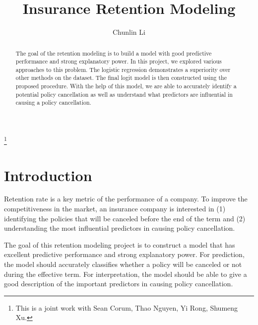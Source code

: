 \documentclass[12pt]{amsart}
\theoremstyle{definition}
\theoremstyle{remark}
\numberwithin{equation}{section}
\let\origmaketitle\maketitle
\def\maketitle{
	\begingroup
	\def\uppercasenonmath##1{} %
	\origmaketitle
	\endgroup
}
\begin{document}
	
	
\title{\large Insurance Retention Modeling }

\author{Chunlin Li}
\thanks{This is a joint work with Sean Corum, Thao Nguyen, Yi Rong, Shumeng Xu.}
\date{}
\dedicatory{}
\keywords{}

\begin{abstract}
The goal of the retention modeling is to build a model with good predictive performance and strong explanatory power. In this project, we explored various approaches to this problem. The logistic regression demonstrates a superiority over other methods on the dataset. The final logit model is then constructed using the proposed procedure. With the help of this model, we are able to accurately identify a potential policy cancellation as well as understand what predictors are influential in causing a policy cancellation. 
\end{abstract}

\maketitle


\section{Introduction}

Retention rate is a key metric of the performance of a company. To improve the competitiveness in the market, an insurance company is interested in (1) identifying the policies that will be canceled before the end of the term and (2) understanding the most influential predictors in causing policy cancellation. 

The goal of this retention modeling project is to construct a model that has excellent predictive performance and strong explanatory power. For prediction, the model should accurately classifies whether a policy will be canceled or not during the effective term. For interpretation, the model should be able to give a good description of the important predictors in causing policy cancellation. 
\end{document}
